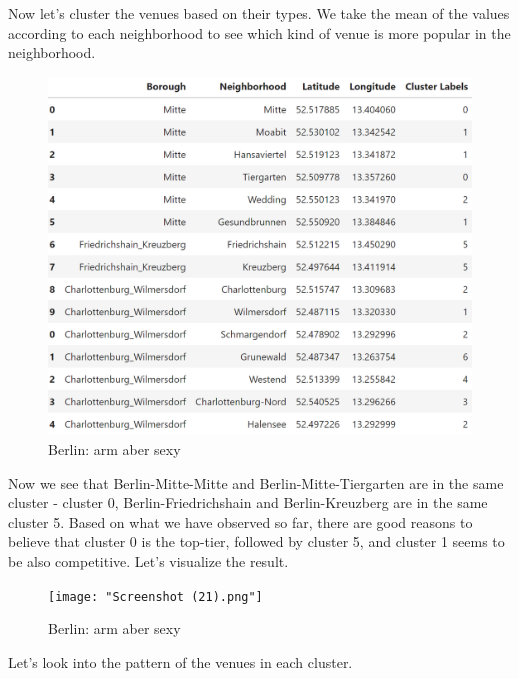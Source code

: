 \documentclass[11pt]{article}
\begin{document}
Now let's cluster the venues based on their types. We take the mean of the values according to each neighborhood to see
which kind of venue is more popular in the neighborhood.

 \begin{figure}
\centering
\includegraphics[scale=0.8]{"Screenshot (33).png"}
\caption{Berlin: arm aber sexy}
\end{figure}

   

        
    Now we see that Berlin-Mitte-Mitte and Berlin-Mitte-Tiergarten are in
the same cluster - cluster 0, Berlin-Friedrichshain and Berlin-Kreuzberg
are in the same cluster 5. Based on what we have observed so far, there
are good reasons to believe that cluster 0 is the top-tier, followed by
cluster 5, and cluster 1 seems to be also competitive. Let's visualize
the result.

              \begin{figure}
\centering
\texttt{[image: "Screenshot (21).png"]}
\caption{Berlin: arm aber sexy}
\end{figure}

  
        
    Let's look into the pattern of the venues in each cluster.
\end{document}
